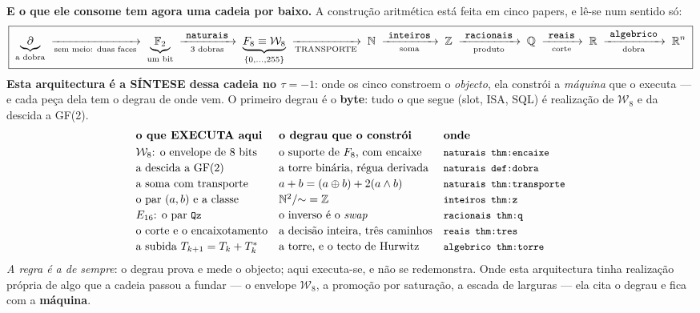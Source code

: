 \documentclass[11pt,a4paper]{article}
\newcommand{\code}[1]{\texttt{\small #1}}
\newcommand{\Word}{\mathcal{W}}
\begin{document}
\medskip\noindent\textbf{E o que ele consome tem agora uma cadeia por baixo.} A
construção aritmética está feita em cinco papers, e lê-se num sentido só:
\[
\boxed{\;
\underbrace{\partial}_{\text{a dobra}}
\;\xrightarrow[\text{sem meio: duas faces}]{}\;
\underbrace{\mathbb{F}_2}_{\text{um bit}}
\;\xrightarrow[\text{3 dobras}]{\ \code{naturais}\ }\;
\underbrace{F_8\equiv\Word_8}_{\{0,\ldots,255\}}
\;\xrightarrow[\text{TRANSPORTE}]{}\;
\mathbb{N}
\;\xrightarrow[\text{soma}]{\ \code{inteiros}\ }\;
\mathbb{Z}
\;\xrightarrow[\text{produto}]{\ \code{racionais}\ }\;
\mathbb{Q}
\;\xrightarrow[\text{corte}]{\ \code{reais}\ }\;
\mathbb{R}
\;\xrightarrow[\text{dobra}]{\ \code{algebrico}\ }\;
\mathbb{R}^{n}\;}
\]
\noindent\textbf{Esta arquitectura é a SÍNTESE dessa cadeia no $\tau=-1$}: onde os cinco
constroem o \emph{objecto}, ela constrói a \emph{máquina} que o executa --- e cada peça
dela tem o degrau de onde vem. O primeiro degrau é o \textbf{byte}: tudo o que
segue (slot, ISA, SQL) é realização de $\Word_8$ e da descida a GF(2).
\[
\begin{array}{lll}
\textbf{o que EXECUTA aqui} & \textbf{o degrau que o constrói} & \textbf{onde}\\[3pt]
\Word_8\text{: o envelope de 8 bits} & \text{o suporte de }F_8\text{, com encaixe} & \code{naturais thm:encaixe}\\[2pt]
\text{a descida a }\mathrm{GF}(2) & \text{a torre binária, régua derivada} & \code{naturais def:dobra}\\[2pt]
\text{a soma com transporte} & a+b=(a\oplus b)+2(a\wedge b) & \code{naturais thm:transporte}\\[2pt]
\text{o par }(a,b)\text{ e a classe} & \mathbb{N}^{2}/{\sim}=\mathbb{Z} & \code{inteiros thm:z}\\[2pt]
E_{16}\text{: o par }\code{Qz} & \text{o inverso é o \emph{swap}} & \code{racionais thm:q}\\[2pt]
\text{o corte e o encaixotamento} & \text{a decisão inteira, três caminhos} & \code{reais thm:tres}\\[2pt]
\text{a subida }T_{k+1}=T_k+T_k^{*} & \text{a torre, e o tecto de Hurwitz} & \code{algebrico thm:torre}
\end{array}
\]
\noindent\emph{A regra é a de sempre}: o degrau prova e mede o objecto; aqui executa-se, e
não se redemonstra. Onde esta arquitectura tinha realização própria de algo que a cadeia
passou a fundar --- o envelope $\Word_8$, a promoção por saturação, a escada de larguras
--- ela cita o degrau e fica com a \textbf{máquina}.
\end{document}
